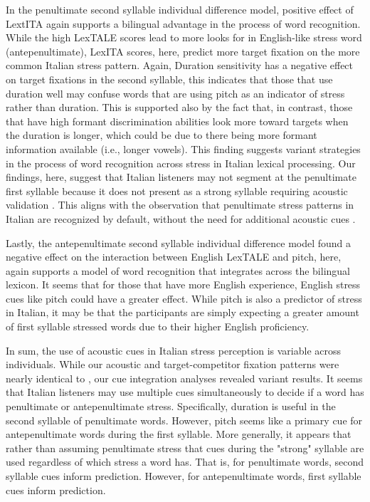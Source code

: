 In the penultimate second syllable individual difference model, positive effect of LextITA again supports a bilingual advantage in the process of word recognition. While the high LexTALE scores lead to more looks for in English-like stress word (antepenultimate), LexITA scores, here, predict more target fixation on the more common Italian stress pattern. Again, Duration sensitivity has a negative effect on target fixations in the second syllable, this indicates that those that use duration well may confuse words that are using pitch as an indicator of stress rather than duration. This is supported also by the fact that, in contrast, those that have high formant discrimination abilities look more toward targets when the duration is longer, which could be due to there being more formant information available (i.e., longer vowels). This finding suggests variant strategies in the process of word recognition across stress in Italian lexical processing. Our findings, here, suggest that Italian listeners may not segment at the penultimate first syllable because it does not present as a strong syllable requiring acoustic validation \cite{CutlerNorris1988}. This aligns with the observation that penultimate stress patterns in Italian are recognized by default, without the need for additional acoustic cues \cite{Sulpizio_McQueen_2012}. 

Lastly, the antepenultimate second syllable individual difference model found a negative effect on the interaction between English LexTALE and pitch, here, again supports a model of word recognition that integrates across the bilingual lexicon. It seems that for those that have more English experience, English stress cues like pitch could have a greater effect. While pitch is also a predictor of stress in Italian, it may be that the participants are simply expecting a greater amount of first syllable stressed words due to their higher English proficiency.

In sum, the use of acoustic cues in Italian stress perception is variable across individuals. While our acoustic and target-competitor fixation patterns were nearly identical to \cite{Sulpizio_McQueen_2012}, our cue integration analyses revealed variant results. It seems that Italian listeners may use multiple cues simultaneously to decide if a word has penultimate or antepenultimate stress. Specifically, duration is useful in the second syllable of penultimate words. However, pitch seems like a primary cue for antepenultimate words during the first syllable. More generally, it appears that rather than assuming penultimate stress that cues during the "strong" syllable are used regardless of which stress a word has. That is, for penultimate words, second syllable cues inform prediction. However, for antepenultimate words, first syllable cues inform prediction. 

